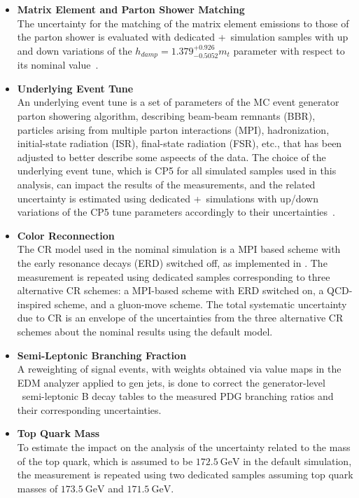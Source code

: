 \begin{itemize}
    \item {\bf Matrix Element and Parton Shower Matching} \\
    The uncertainty for the matching of the matrix element emissions to those of the parton shower is evaluated with dedicated \Powheg+\Pythia\ simulation samples with up and down variations of the $h_{damp} = 1.379^{+0.926}_{-0.5052}m_t$ parameter with respect to its nominal value~\cite{Sirunyan:2669320}.
    \item {\bf Underlying Event Tune} \\
    An underlying event tune is a set of parameters of the MC event generator parton showering algorithm, describing beam-beam remnants (BBR), particles arising from multiple parton interactions (MPI), hadronization, initial-state radiation (ISR), final-state radiation (FSR), etc., that has been adjusted to better describe some aspeects of the data.
    The choice of the underlying event tune, which is CP5 for all simulated samples used in this analysis, can impact the results of the measurements, and the related uncertainty is estimated using dedicated \Powheg+\Pythia\ simulations with up/down variations of the CP5 tune parameters accordingly to their uncertainties~\cite{Sirunyan:2669320}.
    \item {\bf Color Reconnection} \\
    The CR model used in the nominal \ttbar simulation is a MPI based scheme with the early resonance decays (ERD) switched off, as implemented in \Pythia. 
    The measurement is repeated using dedicated \ttbar samples corresponding to three alternative CR schemes: a MPI-based scheme with ERD switched on, a QCD-inspired scheme, and a gluon-move scheme. 
    The total systematic uncertainty due to CR is an envelope of the uncertainties from the three alternative CR schemes about the nominal results using the default model.
    \item {\bf Semi-Leptonic Branching Fraction} \\
    A reweighting of \ttbar signal events, with weights obtained via value maps in the EDM analyzer applied to gen jets, is done to correct the generator-level \Pythia\ semi-leptonic B decay tables to the measured PDG branching ratios and their corresponding uncertainties.
    \item {\bf Top Quark Mass} \\
    To estimate the impact on the analysis of the uncertainty related to the mass of the top quark, which is assumed to be $\SI{172.5}{\GeV}$ in the default simulation, the measurement is repeated using two dedicated samples assuming top quark masses of $\SI{173.5}{\GeV}$ and $\SI{171.5}{\GeV}$.

\end{itemize}
